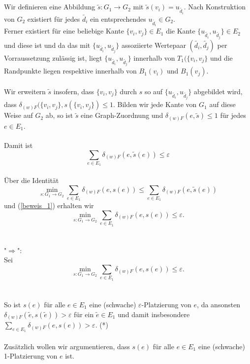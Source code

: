 \documentclass[a4paper, 12pt, twoside]{article}
\theoremstyle{Format1} %
\begin{document}
\\
\\
Wir definieren eine Abbildung $\tilde{s}:G_1 \to G_2$ mit $\tilde{s}(v_i) = u_{\tilde{d_i}}$.
Nach Konstruktion von $G_2$ existiert für jedes $\tilde{d_i}$ ein entsprechendes $u_{\tilde{d_i}} \in G_2$.
\\
Ferner existiert für eine beliebige Kante $\{v_i, v_j\} \in E_1$ die Kante $\{u_{\tilde{d_i}}, u_{\tilde{d_j}}\} \in E_2$ und diese ist
und da das mit $\{u_{\tilde{d_i}}, u_{\tilde{d_j}}\}$ assoziierte Wertepaar $(\tilde{d_i},\tilde{d_j})$ per Vorraussetzung zulässig ist,
liegt $\{u_{\tilde{d_i}}, u_{\tilde{d_j}}\}$ innerhalb von $T_1(\{v_i, v_j\}$ und die Randpunkte liegen respektive innerhalb von $B_1(v_i)$ und $B_1(v_j)$.
\\
\\
Wir erweitern $\tilde{s}$ insofern, dass $\{v_i, v_j\}$ durch $s$ so auf $\{u_{\tilde{d_i}}, u_{\tilde{d_j}}\}$ abgebildet wird,
dass $\delta_{(w)F}(\{v_i, v_j\}, s(\{v_i, v_j\}) \leq 1$. Bilden wir jede Kante von $G_1$ auf diese Weise auf $G_2$ ab, so ist $\tilde{s}$ eine Graph-Zuordnung
und $\delta_{(w)F}(e, \tilde{s}) \leq 1$ für jedes $e \in E_1$.
\\
\\
Damit ist
\begin{equation} \label{beweis_1}
	\sum_{e \in E_1} \delta_{(w)F}(e, \tilde{s}(e)) \leq \varepsilon
\end{equation}
\\
Über die Identität $$\min_{s: G_1 \to G_2} \sum_{e \in E_1} \delta_{(w)F}(e, s(e)) \leq \sum_{e \in E_1} \delta_{(w)F}(e,\tilde{s}(e)) $$
und (\ref{beweis_1}) erhalten wir
$$\min_{s: G_1 \to G_2} \sum_{e \in E_1} \delta_{(w)F}(e, s(e)) \leq \varepsilon .$$
\\
\\
"$\Rightarrow$":
\\
Sei $$\min_{s: G_1 \to G_2} \sum_{e \in E_1} \delta_{(w)F}(e, s(e)) \leq {\varepsilon}.$$
\\
\\
So ist $s(e)$ für alle $e \in E_1$ eine (schwache) $\varepsilon$-Platzierung von $e$,
da ansonsten $\delta_{(w)F}(\tilde{e}, s(\tilde{e})) > \varepsilon$ für ein $\tilde{e} \in E_1$ und damit insbesondere $\sum_{{e}\in E_1} \delta_{(w)F}(e, s(e)) > \varepsilon$.
(*)
\\
\\
Zusätzlich wollen wir argumentieren, dass $s(e)$ für alle $e \in E_1$ eine (schwache) 1-Platzierung von $e$ ist.
\end{document}
